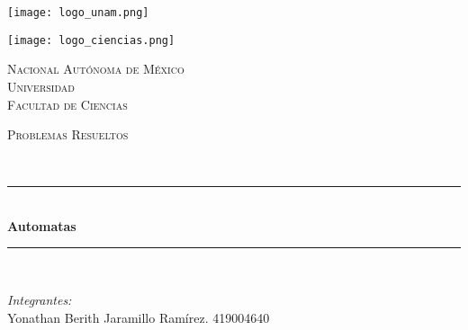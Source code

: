 \begin{center}
    \newcommand{\HRule}{\rule{\linewidth}{0.5mm}}
    \begin{minipage}{0.48\textwidth} 
        \begin{flushleft}
            \texttt{[image: logo\_unam.png]}
        \end{flushleft}
    \end{minipage}
    \begin{minipage}{0.48\textwidth} 
        \begin{flushright}
            \texttt{[image: logo\_ciencias.png]}
        \end{flushright}
    \end{minipage}
    \vspace*{-1.5cm}						
    \textsc{\huge Nacional Autónoma de México \\ \vspace{-4px} Universidad }\\[2cm]	
    \textsc{\LARGE Facultad de Ciencias}\\[1.5cm]
    \begin{minipage}{0.9\textwidth} 
        \begin{center}
            \textsc{\LARGE Problemas Resueltos}
        \end{center}
    \end{minipage}\\[0.5cm]
    \vspace*{1cm}					
        \HRule \\[0.4cm]							
            { \huge \bfseries Automatas}\\[0.4cm]	
        \HRule \\[1.5cm]						    
    \begin{minipage}{0.52\textwidth}													
        \begin{flushleft} \large						\small				\vspace{-0.6cm}	
            \vspace{-0.6cm}	
            \emph{Integrantes:}\\
           Yonathan Berith Jaramillo Ramírez. 419004640 \\
            \vspace*{2cm}
        \end{flushleft}																		
    \end{minipage}		
    \begin{minipage}{0.46\textwidth}		
        \vspace{-0.6cm}											

\end{minipage}
\end{center}
